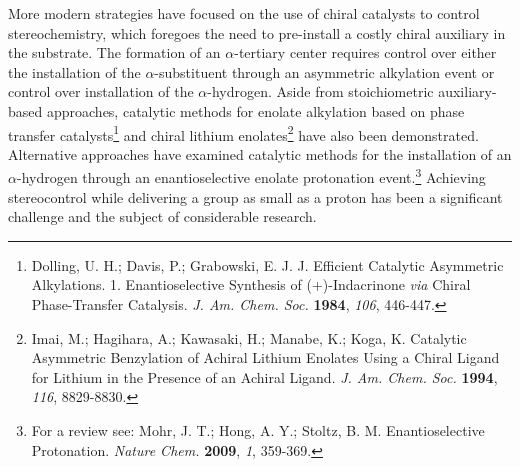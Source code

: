 More modern strategies have focused on the use of chiral catalysts to control stereochemistry, which
foregoes the need to pre-install a costly chiral auxiliary in the substrate. The formation of an
$\alpha$-tertiary center requires control over either the installation of the $\alpha$-substituent
through an asymmetric alkylation event or control over installation of the $\alpha$-hydrogen. Aside
from stoichiometric auxiliary-based approaches, catalytic methods for enolate alkylation based on
phase transfer catalysts\footnote{{\frenchspacing Dolling, U. H.; Davis, P.; Grabowski, E. J. J.
Efficient Catalytic Asymmetric Alkylations. 1. Enantioselective Synthesis of (+)-Indacrinone
\textit{via} Chiral Phase-Transfer Catalysis. \textit{J. Am. Chem. Soc.} \textbf{1984}, \textit{106}, 446-447.}} and chiral lithium enolates\footnote{{\frenchspacing Imai, M.; Hagihara, A.; Kawasaki, H.; Manabe, K.; Koga, K. Catalytic Asymmetric Benzylation of Achiral Lithium Enolates Using a Chiral Ligand for Lithium in the Presence of an Achiral Ligand. \textit{J. Am. Chem. Soc.}
\textbf{1994}, \textit{116}, 8829-8830.}} have also been demonstrated. Alternative approaches have
examined catalytic methods for the installation of an $\alpha$-hydrogen through an enantioselective
enolate protonation event.\footnote{For a review see:
{\frenchspacing Mohr, J.
T.; Hong, A.
Y.; Stoltz, B.
M.
Enantioselective Protonation. \textit{Nature Chem.} \textbf{2009}, \textit{1}, 359-369.}} Achieving
stereocontrol while delivering a group as small as a proton has been a significant challenge and
the subject of considerable research.
 
